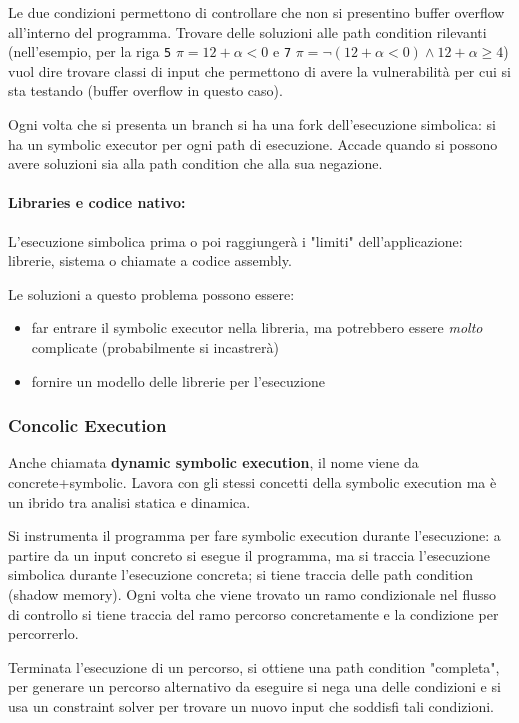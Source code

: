 Le due condizioni permettono di controllare che non si presentino buffer overflow all'interno del programma. Trovare delle soluzioni alle path condition rilevanti (nell'esempio, per la riga \texttt{5} $\pi  =12 + \alpha < 0$ e \texttt{7} $\pi = \neg (12 + \alpha < 0) \wedge 12 + \alpha \geq 4$) vuol dire trovare classi di input che permettono di avere la vulnerabilità per cui si sta testando (buffer overflow in questo caso).

Ogni volta che si presenta un branch si ha una fork dell'esecuzione simbolica: si ha un symbolic executor per ogni path di esecuzione. Accade quando si possono avere soluzioni sia alla path condition che alla sua negazione. 

\paragraph{Libraries e codice nativo:} L'esecuzione simbolica prima o poi raggiungerà i "limiti" dell'applicazione: librerie, sistema o chiamate a codice assembly.

Le soluzioni a questo problema possono essere: 
\begin{itemize}
	\item far entrare il symbolic executor nella libreria, ma potrebbero essere \textit{molto} complicate (probabilmente si incastrerà)

	\item fornire un modello delle librerie per l'esecuzione
\end{itemize}

\subsubsection{Concolic Execution}

Anche chiamata \textbf{dynamic symbolic execution}, il nome viene da concrete+symbolic. Lavora con gli stessi concetti della symbolic execution ma è un ibrido tra analisi statica e dinamica.

Si instrumenta il programma per fare symbolic execution durante l'esecuzione: a partire da un input concreto si esegue il programma, ma si traccia l'esecuzione simbolica durante l'esecuzione concreta; si tiene traccia delle path condition (shadow memory). Ogni volta che viene trovato un ramo condizionale nel flusso di controllo si tiene traccia del ramo percorso concretamente e la condizione per percorrerlo.

Terminata l'esecuzione di un percorso, si ottiene una path condition "completa", per generare un percorso alternativo da eseguire si nega una delle condizioni e si usa un constraint solver per trovare un nuovo input che soddisfi tali condizioni.

